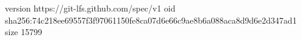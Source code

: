 version https://git-lfs.github.com/spec/v1
oid sha256:74c218ee69557f3f97061150fe8ca07d6e66c9ae8b6a088aca8d9d6e2d347ad1
size 15799
